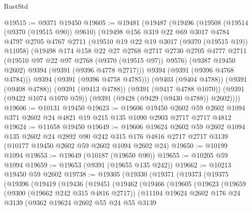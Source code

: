 \begin{lexlean}{RustStd}
\begin{coremodule}
@19515 := @9371 @19450
@19605 := @19481
    (@19487
      (@19496
        (@19508
          (@19514 (@9370 (@19515 @90)) @9610)
          (@19498
            @156
            @319
            @22
            @69
            @3017
            @4784
            @4797
            @2705
            @4767
            @2711
            (@19510 @19 @22 @19 @3017 (@9370 (@19515 @19)) @11058)
            (@19498
              @174
              @158
              @22
              @27
              @2768
              @2717
              @2730
              @2705
              @4777
              @2711
              (@19510 @97 @22 @97 @2768 (@9370 (@19515 @97)) @9576)
              (@9387 @19450 @2602)
              @9394
              (@9391 (@9396 @4778 @2717)))
            @9394
            (@9391 (@9396 @4768 @4784)))
          @9394
          (@9391 (@9396 @4758 @4785)))
        (@9403 (@9404 @4788))
        (@9391 (@9408 @4788))
        (@9391 (@9413 @4788))
        (@9391 (@9417 @4788 @1070))
        (@9391 (@9422 @1074 @1070 @59))
        (@9391 (@9428 (@9429 (@9430 @4788)) @2602))))
@19606 := @10131 @19450
@19623 := @19606
    @19450
    @2602
    @59
    @2602
    @1094
    @371
    @2602
    @24
    @4821
    @19
    @215
    @135
    @1090
    @2903
    @2717
    @2717
    @4812
@19624 := @11658 @19450
@19649 := @19606
    @19624
    @2602
    @59
    @2602
    @1094
    @135
    @2602
    @24
    @2892
    @90
    @242
    @315
    @176
    @4816
    @2717
    @2717
    @3139
    (@10177 @19450 @2602 @59 @2602 @1094 @2602 @24)
@19650 := @10199 @1094
@19653 := @19649 (@10187 (@19650 @90))
@19655 := @10205 @59 @1094
@19659 := @19653 (@9391 (@19655 @135 @242))
@19662 := @10213 @19450 @59 @2602
@19738 := @19305
    (@19330
      (@19371
        (@19373
          (@19375
            (@19396
              (@19419
                (@19436
                  (@19451
                    (@19462
                      (@19466
                        (@19605
                          (@19623
                            (@19659
                              (@9300 (@19662 @242 @315 @4816 @2717))
                              (@11104
                                @19624
                                @2602
                                @176
                                @24
                                @3139
                                (@9362
                                  @19624
                                  @2602
                                  @55
                                  @24
                                  @55
                                  @3139

\end{coremodule}
\end{lexlean}
